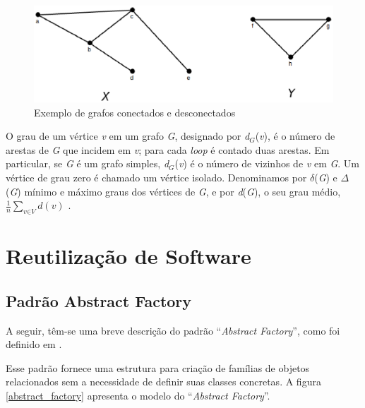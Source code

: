 \begin{apendicesenv}
\begin{figure}[!h]
	\centering
	\includegraphics[scale=0.45]{figuras/capitulo2/desconectados.eps}
	\caption[Exemplo de grafos conectados e desconectados]{Exemplo de grafos conectados e desconectados \cite{Bondy:2007}}
	\label{desconectados}
\end{figure}

O grau de um vértice \textit{v} em um grafo \textit{G}, designado por \textit{d$_G$}(\textit{v}), é o número de arestas de \textit{G} que incidem em \textit{v}; para cada \textit{loop} é contado duas arestas. Em particular, se \textit{G} é um grafo simples, \textit{d$_G$}(\textit{v}) é o número de vizinhos de \textit{v} em \textit{G}. Um vértice de grau zero é chamado um vértice isolado. Denominamos por $\delta$(\textit{G}) e $\Delta$(\textit{G}) mínimo e máximo graus dos vértices de \textit{G}, e por \textit{d}(\textit{G}), o seu grau médio, $\frac{1}{n}\sum_{\textit{v}\in\textit{V}} \textit{d}(\textit{v})$ \cite{Diestel:1997}.

\chapter{Reutilização de Software}

\section{Padrão Abstract Factory}
\label{sec:padrao_abstract_factory}

A seguir, têm-se uma breve descrição do padrão ``\textit{Abstract Factory}'', como foi definido em \cite{Gamma:1995}.

Esse padrão fornece uma estrutura para criação de famílias de objetos relacionados sem a necessidade de definir suas classes concretas. A figura \ref{abstract_factory} apresenta o modelo do ``\textit{Abstract Factory}''.


\end{apendicesenv}
